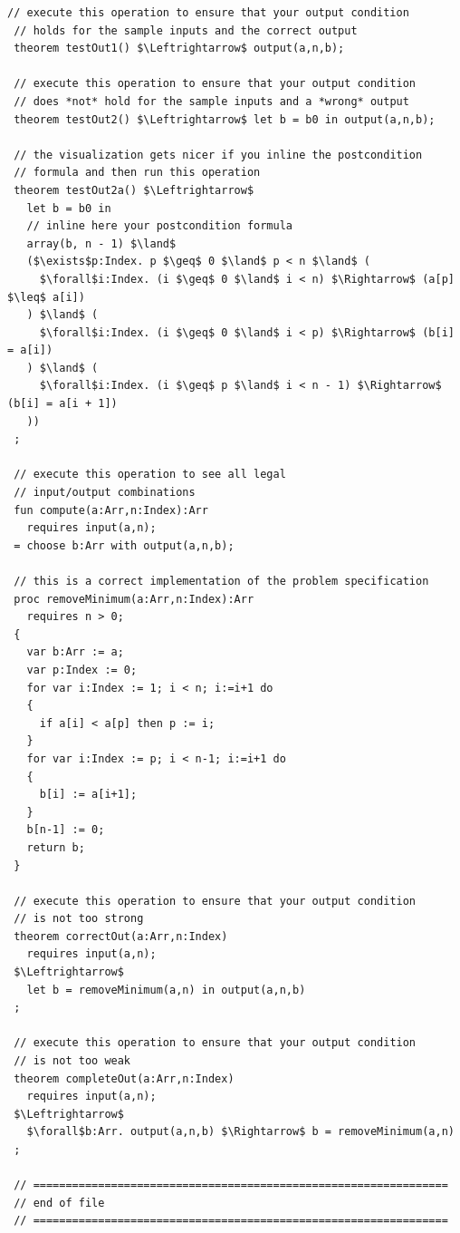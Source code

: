 \documentclass{article}
\begin{document}
\begin{lstlisting}[mathescape=true, columns=flexible]
 // execute this operation to ensure that your output condition
 // holds for the sample inputs and the correct output
 theorem testOut1() $\Leftrightarrow$ output(a,n,b);
 
 // execute this operation to ensure that your output condition
 // does *not* hold for the sample inputs and a *wrong* output
 theorem testOut2() $\Leftrightarrow$ let b = b0 in output(a,n,b);
 
 // the visualization gets nicer if you inline the postcondition
 // formula and then run this operation
 theorem testOut2a() $\Leftrightarrow$
   let b = b0 in
   // inline here your postcondition formula  
   array(b, n - 1) $\land$
   ($\exists$p:Index. p $\geq$ 0 $\land$ p < n $\land$ (
     $\forall$i:Index. (i $\geq$ 0 $\land$ i < n) $\Rightarrow$ (a[p] $\leq$ a[i])
   ) $\land$ (
     $\forall$i:Index. (i $\geq$ 0 $\land$ i < p) $\Rightarrow$ (b[i] = a[i])
   ) $\land$ (
     $\forall$i:Index. (i $\geq$ p $\land$ i < n - 1) $\Rightarrow$ (b[i] = a[i + 1])
   ))
 ;
 
 // execute this operation to see all legal
 // input/output combinations
 fun compute(a:Arr,n:Index):Arr
   requires input(a,n);
 = choose b:Arr with output(a,n,b);
 
 // this is a correct implementation of the problem specification
 proc removeMinimum(a:Arr,n:Index):Arr
   requires n > 0;
 {
   var b:Arr := a;
   var p:Index := 0;
   for var i:Index := 1; i < n; i:=i+1 do
   {
     if a[i] < a[p] then p := i;
   }
   for var i:Index := p; i < n-1; i:=i+1 do
   {
     b[i] := a[i+1];
   }
   b[n-1] := 0;
   return b;
 }
 
 // execute this operation to ensure that your output condition
 // is not too strong
 theorem correctOut(a:Arr,n:Index) 
   requires input(a,n);
 $\Leftrightarrow$
   let b = removeMinimum(a,n) in output(a,n,b)
 ;
 
 // execute this operation to ensure that your output condition
 // is not too weak
 theorem completeOut(a:Arr,n:Index) 
   requires input(a,n);
 $\Leftrightarrow$
   $\forall$b:Arr. output(a,n,b) $\Rightarrow$ b = removeMinimum(a,n)
 ;
 
 // ================================================================
 // end of file
 // ================================================================ 
\end{lstlisting}
\end{document}
